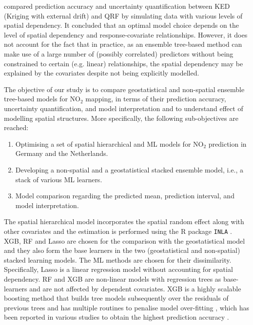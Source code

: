 \documentclass{article}
\begin{document}
\cite{fouedjio2019exploring} compared prediction accuracy and uncertainty quantification between KED (Kriging with external drift) and QRF by simulating data with various levels of spatial dependency. It concluded that an optimal model choice depends on the level of spatial dependency and response-covariate relationships. However, it does not account for the fact that in practice, as an ensemble tree-based method can make use of a large number of (possibly correlated) predictors without being constrained to certain (e.g. linear) relationships, the spatial dependency may be explained by the covariates despite not being explicitly modelled. 

The objective of our study is to compare geostatistical and non-spatial ensemble tree-based models for NO$_2$ mapping, in terms of their prediction accuracy, uncertainty quantification, and model interpretation and to understand effect of modelling spatial structures. More specifically, the following sub-objectives are reached:

\begin{enumerate}
    \item Optimising a set of  spatial hierarchical and ML models for NO$_2$ prediction in Germany and the Netherlands.
    
    \item Developing a non-spatial and a geostatistical stacked ensemble model, i.e., a stack of various ML learners.
    \item Model comparison regarding the predicted mean, prediction interval, and model interpretation.  
\end{enumerate}

 
 
The spatial hierarchical model incorporates the spatial random effect along with other covariates and the estimation is performed using the R package \texttt{INLA} \citep{rue2009approximate,martins2013bayesian}. XGB, RF and Lasso are chosen for the comparison with the geostatistical model and they also form the base learners in the two (geostatistical and non-spatial) stacked learning models. The ML methods are chosen for their dissimilarity. Specifically, Lasso is a linear regression model without accounting for spatial dependency. RF and XGB are non-linear models with regression trees as base-learners and are not affected by dependent covariates. XGB is a highly scalable boosting method that builds tree models subsequently over the residuals of previous trees and has multiple routines to penalise model over-fitting \citep{xgboost}, which has been reported in various studies to obtain the highest prediction accuracy \cite{luglobal}. 
\end{document}
